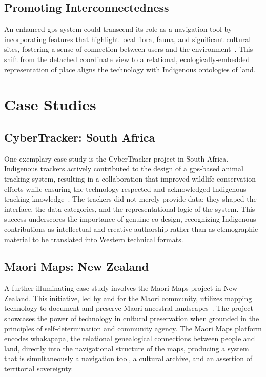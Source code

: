 \documentclass[11pt,showkeys]{essay}
\begin{document}
\subsection{Promoting Interconnectedness}

An enhanced \gls{gps} system could transcend its role as a navigation tool by incorporating features that highlight local flora, fauna, and significant cultural sites, fostering a sense of connection between users and the environment~\cite{council_why_2022}. This shift from the detached coordinate view to a relational, ecologically-embedded representation of place aligns the technology with Indigenous ontologies of land.

\section{Case Studies}

\subsection{CyberTracker: South Africa}

One exemplary case study is the CyberTracker project in South Africa. Indigenous trackers actively contributed to the design of a \gls{gps}-based animal tracking system, resulting in a collaboration that improved wildlife conservation efforts while ensuring the technology respected and acknowledged Indigenous tracking knowledge~\cite{cross_indigenous_2020,liebenberg_citizen_2015}. The trackers did not merely provide data: they shaped the interface, the data categories, and the representational logic of the system. This success underscores the importance of genuine co-design, recognizing Indigenous contributions as intellectual and creative authorship rather than as ethnographic material to be translated into Western technical formats.

\subsection{Maori Maps: New Zealand}

A further illuminating case study involves the Maori Maps project in New Zealand. This initiative, led by and for the Maori community, utilizes mapping technology to document and preserve Maori ancestral landscapes~\cite{oppenneer_maori_2011,news_maori_2021,tapsell_maori_2011}. The project showcases the power of technology in cultural preservation when grounded in the principles of self-determination and community agency. The Maori Maps platform encodes whakapapa, the relational genealogical connections between people and land, directly into the navigational structure of the maps, producing a system that is simultaneously a navigation tool, a cultural archive, and an assertion of territorial sovereignty.
\end{document}
